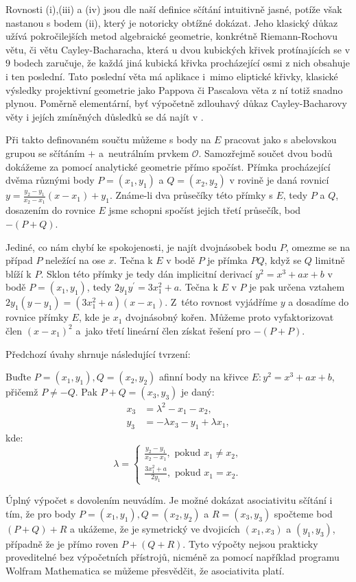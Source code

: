 \documentclass[12pt]{report}
\begin{document}
Rovnosti (i),(iii) a (iv) jsou dle naší definice sčítání intuitivně jasné, potíže však nastanou s bodem (ii), který je notoricky obtížné dokázat. Jeho klasický důkaz užívá pokročilejších metod algebraické geometrie, konkrétně Riemann-Rochovu větu, či větu Cayley-Bacharacha, která u dvou kubických křivek protínajících se v $9$ bodech zaručuje, že každá jiná kubická křivka procházející osmi z nich obsahuje i ten poslední. Tato poslední věta má aplikace i~mimo eliptické křivky, klasické výsledky projektivní geometrie jako Pappova či Pascalova věta z ní totiž snadno plynou. Poměrně elementární, byť výpočetně zdlouhavý důkaz Cayley-Bacharovy věty i jejích zmíněných důsledků se dá najít v \cite[Sec. 2.3]{Washington}.

Při takto definovaném součtu můžeme s body na $E$ pracovat jako s abelovskou grupou se sčítáním $+$ a~neutrálním prvkem $\mathcal{O}$. Samozřejmě součet dvou bodů dokážeme za pomocí analytické geometrie přímo spočíst. Přímka procházející dvěma různými body $P = (x_1,y_1)$ a $Q = (x_2,y_2)$ v rovině je daná rovnicí $y = \frac{y_2-y_1}{x_2-x_1} (x-x_1) + y_1$. Známe-li dva průsečíky této přímky s $E$, tedy $P$ a $Q$, dosazením do rovnice $E$ jsme schopni spočíst jejich třetí průsečík, bod $-(P+Q)$. 

Jediné, co nám chybí ke spokojenosti, je najít dvojnásobek bodu $P$, omezme se na případ $P$ neležící na ose $x$. Tečna k $E$ v bodě $P$ je přímka $PQ$, když se $Q$ limitně blíží k $P$. Sklon této přímky je tedy dán implicitní derivací $y^2 = x^3+ax+b$ v bodě $P = (x_1,y_1)$, tedy $2 y_1 y^\prime =3x_1 ^2 + a$. Tečna k $E$ v $P$ je pak určena vztahem $2y_1(y-y_1) = (3x_1 ^2+a)(x-x_1)$. Z~této rovnost vyjádříme $y$ a dosadíme do rovnice přímky $E$, kde je $x_1$ dvojnásobný kořen. Můžeme proto vyfaktorizovat člen $(x-x_1)^2$ a~jako třetí lineární člen získat řešení pro $-(P+P)$.

Předchozí úvahy shrnuje následující tvrzení:

\begin{veta}\label{sum}
Buďte $P = (x_1,y_1), Q = (x_2,y_2)$ afinní body na křivce $E : y^2 = x^3+ax+b$, přičemž $P \neq -Q$. Pak $P+Q = (x_3,y_3)$ je daný:
\begin{align*}
x_3 &= \lambda^2 - x_1 - x_2,\\
y_3 &= - \lambda x_3 - y_1 + \lambda x_1,
\end{align*}
kde:
\begin{equation*}
\lambda = \begin{cases}
\frac{y_2 - y_1}{x_2-x_1}, \text{ pokud } x_1 \neq x_2,\\
\frac{3x_1 ^2 + a}{2y_1}, \text{ pokud } x_1 = x_2.
\end{cases}
\end{equation*}

\end{veta}
Úplný výpočet s dovolením neuvádím. Je možné dokázat asociativitu sčítání i tím, že pro body $P = (x_1,y_1), Q = (x_2,y_2)$ a $R = (x_3,y_3)$ spočteme bod $(P+Q)+R$ a ukážeme, že je symetrický ve dvojicích $(x_1,x_3)$ a $(y_1,y_3)$, případně že je přímo roven $P+(Q+R)$. Tyto výpočty nejsou prakticky proveditelné bez výpočetních přístrojů, nicméně za pomocí například programu Wolfram Mathematica se můžeme přesvědčit, že asociativita platí.
\end{document}
